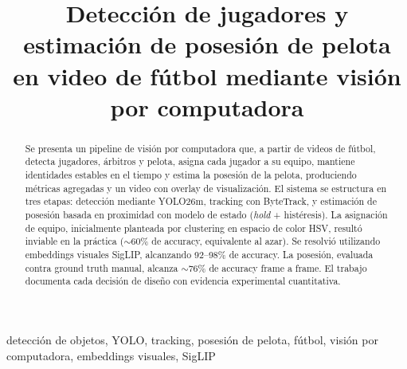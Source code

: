 \documentclass[conference]{IEEEtran}
\begin{document}
\title{Detección de jugadores y estimación de posesión de pelota en video de fútbol mediante visión por computadora}

\author{
\and
{}
\and
{}
}

\maketitle

\begin{abstract}
Se presenta un pipeline de visión por computadora que, a partir de videos de
fútbol, detecta jugadores, árbitros y pelota, asigna cada jugador a su
equipo, mantiene identidades estables en el tiempo y estima la posesión de
la pelota, produciendo métricas agregadas y un video con overlay de
visualización. El sistema se estructura en tres etapas: detección mediante
YOLO26m, tracking con ByteTrack, y estimación de posesión basada en
proximidad con modelo de estado (\emph{hold} + histéresis). La asignación
de equipo, inicialmente planteada por clustering en espacio de color HSV,
resultó inviable en la práctica ($\sim$60\% de accuracy, equivalente al
azar). Se resolvió utilizando embeddings visuales SigLIP, alcanzando
92--98\% de accuracy. La posesión, evaluada contra ground truth manual,
alcanza $\sim$76\% de accuracy frame a frame. El trabajo documenta cada
decisión de diseño con evidencia experimental cuantitativa.
\end{abstract}

\begin{IEEEkeywords}
detección de objetos, YOLO, tracking, posesión de pelota, fútbol, visión por computadora, embeddings visuales, SigLIP
\end{IEEEkeywords}

\end{document}
